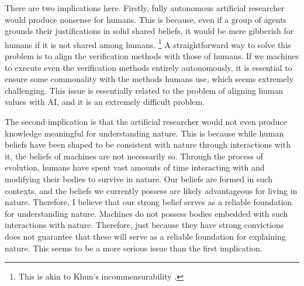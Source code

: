 There are two implications here. Firstly, fully autonomous artificial researcher would produce nonsense for humans. This is because, even if a group of agents grounds their justifications in solid shared beliefs, it would be mere gibberish for humans if it is not shared among humans. \footnote{
This is akin to Khun's incommensurability \cite{kuhn1962}. 
} A straightforward way to solve this problem is to align the verification methods with those of humans. If we machines to execute even the verification methods entirely autonomously, it is essential to ensure some commonality with the methods humans use, which seems extremely challenging. This issue is essentially related to the problem of aligning human values with AI, and it is an extremely difficult problem.



The second implication is that the artificial researcher would not even produce knowledge meaningful for understanding nature. This is because while human beliefs have been shaped to be consistent with nature through interactions with it, the beliefs of machines are not necessarily so. Through the process of evolution, humans have spent vast amounts of time interacting with and modifying their bodies to survive in nature. Our beliefs are formed in such contexts, and the beliefs we currently possess are likely advantageous for living in nature. Therefore, I believe that our strong belief serves as a reliable foundation for understanding nature. Machines do not possess bodies embedded with such interactions with nature. Therefore, just because they have strong convictions does not guarantee that these will serve as a reliable foundation for explaining nature. This seems to be a more serious issue than the first implication.

